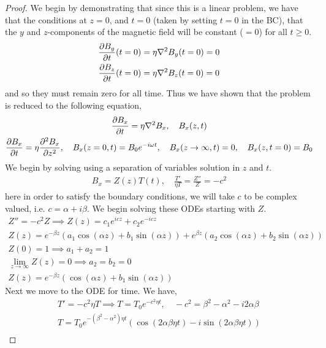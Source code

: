 \documentclass{article}
\begin{document}
\begin{proof}
    We begin by demonstrating that since this is a linear problem, we have that
    the conditions at $z = 0$, and $t = 0$ (taken by setting $t = 0$ in the BC),
    that the $y$ and $z$-components of the magnetic field will be constant ($ =
    0$) for all $t \ge 0$. 
    \begin{gather*}
        \frac{\partial B_y}{\partial t}(t = 0) = \eta \nabla^2B_y(t = 0) = 0\\
        \frac{\partial B_z}{\partial t}(t = 0) = \eta \nabla^2B_z(t = 0) = 0
    \end{gather*}
    and so they must remain zero for all time. Thus we have shown that the
    problem is reduced to the following equation, 
    \begin{gather*}
        \frac{\partial B_x}{\partial t} = \eta \nabla^2B_x, \quad B_x(z,t)\\
        \frac{\partial B_x}{\partial t} = \eta \frac{\partial^2 B_x}{\partial z^2}, \quad B_x(z=0,t) = B_0e^{-i\omega t},
        \quad B_x(z\to\infty,t) = 0, \quad B_x(z, t=0) = B_0
    \end{gather*}
    We begin by solving using a separation of variables solution in $z$ and
    $t$. 
    \begin{gather*}
        B_x = Z(z)T(t), \quad \frac{T'}{\eta T} = \frac{Z''}{Z} = -c^2
    \end{gather*}
    here in order to satisfy the boundary conditions, we will take $c$ to be
    complex valued, i.e. $c = \alpha + i\beta$. We begin solving these ODEs starting with
    $Z$. 
    \begin{gather*}
        Z'' = -c^2Z \implies Z(z) = c_1e^{icz} + c_2e^{-icz}\\
        Z(z) = e^{-\beta z}\left(a_1\cos(\alpha z) + b_1\sin(\alpha z)\right) +
        e^{\beta z}\left(a_2\cos(\alpha z) + b_2\sin(\alpha z)\right) \\
        Z(0) = 1 \implies a_1 + a_2 = 1\\
        \lim_{z\to\infty}Z(z) = 0 \implies a_2 = b_2 = 0\\
        Z(z) = e^{-\beta z}\left(\cos(\alpha z) + b_1\sin(\alpha z)\right)
    \end{gather*}
    Next we move to the ODE for time. We have, 
    \begin{gather*}
        T' = -c^2\eta T \implies T = T_0e^{-c^2\eta t}, \quad -c^2 = \beta^2 -
        \alpha^2 -  i2\alpha\beta \\
        T = T_0e^{-(\beta^2 - \alpha^2)\eta t}\left(\cos(2\alpha\beta\eta t)
        - i\sin(2\alpha\beta\eta t)\right)\\

\end{gather*}
\end{proof}
\end{document}

